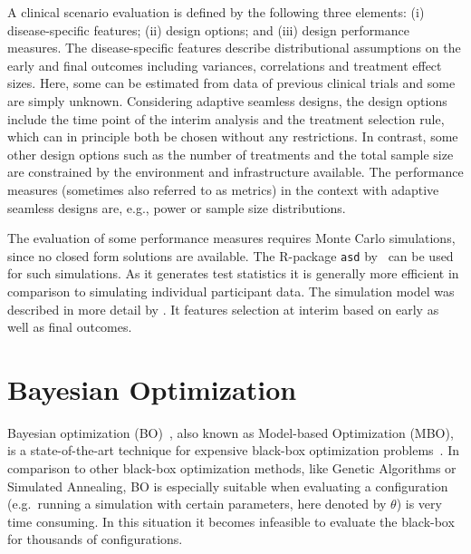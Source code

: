 \documentclass[bimj,fleqn]{w-art}
\theoremstyle{plain}
\theoremstyle{definition}
\begin{document}
A clinical scenario evaluation is defined by the following three elements: (i) disease-specific features; (ii) design options; and (iii) design performance measures.
The disease-specific features describe distributional assumptions on the early and final outcomes including variances, correlations and treatment effect sizes.
Here, some can be estimated from data of previous clinical trials and some are simply unknown. Considering adaptive seamless designs, the design options include the time point of the interim analysis and the treatment selection rule, which can in principle both be chosen without any restrictions.
In contrast, some other design options such as the number of treatments and the total sample size are constrained by the environment and infrastructure available.
The performance measures (sometimes also referred to as metrics) in the context with adaptive seamless designs are, e.g., power or sample size distributions.

The evaluation of some performance measures requires Monte Carlo simulations, since no closed form solutions are available. 
The R-package \texttt{asd} by~\citet{parsons_software_2011} can be used for such simulations.
As it generates test statistics it is generally more efficient in comparison to simulating individual participant data.
The simulation model was described in more detail by \citet{friede_adaptive_2020}. 
It features selection at interim based on early as well as final outcomes.


\section{Bayesian Optimization}
\label{sec:bayesian_optimization}

Bayesian optimization (BO)~\citep{jones_taxonomy_2001}, also known as Model-based Optimization (MBO), is a state-of-the-art technique for expensive black-box optimization problems~\citep{shahriari_taking_2016}.
In comparison to other black-box optimization methods, like Genetic Algorithms or Simulated Annealing, BO is especially suitable when evaluating a configuration (e.g.\ running a simulation with certain parameters, here denoted by $\theta$) is very time consuming.
In this situation it becomes infeasible to evaluate the black-box for thousands of configurations.
\end{document}
